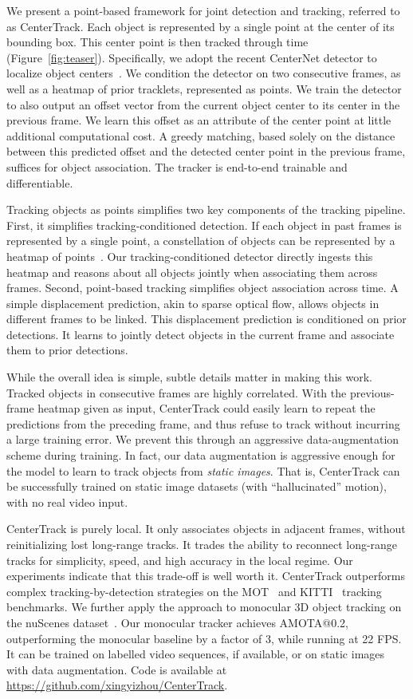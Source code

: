 \documentclass[runningheads]{llncs}
\newcommand{\reffig}[1]{Figure~\ref{fig:#1}}
\begin{document}
We present a point-based framework for joint detection and tracking, referred to as CenterTrack.
Each object is represented by a single point at the center of its bounding box.
This center point is then tracked through time (\reffig{teaser}).
Specifically, we adopt the recent CenterNet detector to localize object centers~\cite{zhou2019objects}.
We condition the detector on two consecutive frames, as well as a heatmap of prior tracklets, represented as points.
We train the detector to also output an offset vector from the current object center to its center in the previous frame.
We learn this offset as an attribute of the center point at little additional computational cost.
A greedy matching, based solely on the distance between this predicted offset and the detected center point in the previous frame, suffices for object association.
The tracker is end-to-end trainable and differentiable.

Tracking objects as points simplifies two key components of the tracking pipeline.
First, it simplifies tracking-conditioned detection.
If each object in past frames is represented by a single point, a constellation of objects can be represented by a heatmap of points~\cite{carreira2016human}.
Our tracking-conditioned detector directly ingests this heatmap and reasons about all objects jointly when associating them across frames.
Second, point-based tracking simplifies object association across time.
A simple displacement prediction, akin to sparse optical flow, allows objects in different frames to be linked.
This displacement prediction is conditioned on prior detections.
It learns to jointly detect objects in the current frame and associate them to prior detections.

While the overall idea is simple, subtle details matter in making this work.
Tracked objects in consecutive frames are highly correlated.
With the previous-frame heatmap given as input, CenterTrack could easily learn to repeat the predictions from the preceding frame, and thus refuse to track without incurring a large training error.
We prevent this through an aggressive data-augmentation scheme during training.
In fact, our data augmentation is aggressive enough for the model to learn to track objects from \emph{static images}. That is, CenterTrack can be successfully trained on static image datasets (with ``hallucinated'' motion), with no real video input.

CenterTrack is purely local. It only associates objects in adjacent frames, without reinitializing lost long-range tracks.
It trades the ability to reconnect long-range tracks for simplicity, speed, and high accuracy in the local regime.
Our experiments indicate that this trade-off is well worth it.
CenterTrack outperforms complex tracking-by-detection strategies on the MOT~\cite{MOT16} and KITTI~\cite{Geiger2012CVPR} tracking benchmarks.
We further apply the approach to monocular 3D object tracking on the nuScenes dataset~\cite{nuscenes2019}.
Our monocular tracker achieves  AMOTA@0.2, outperforming the monocular baseline by a factor of 3, while running at 22 FPS.
It can be trained on labelled video sequences, if available, or on static images with data augmentation.
Code is available at \textcolor{magenta}{\url{https://github.com/xingyizhou/CenterTrack}}.
\end{document}
